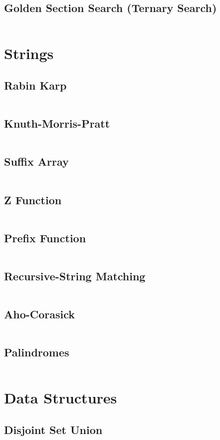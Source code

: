 \documentclass[a4paper, 10pt, twocolumn, landscape]{article}
\begin{document}
  \subsection{Golden Section Search (Ternary Search)}
  \inputminted{cpp}{math/gss.cpp}

  \section{Strings}
  \subsection{Rabin Karp}
  \inputminted{cpp}{strings/rabin-karp.cpp}
  \subsection{Knuth-Morris-Pratt}
  \inputminted{cpp}{strings/kmp.cpp}
  \subsection{Suffix Array}
  \inputminted{cpp}{strings/suffix-array.cpp}
  \subsection{Z Function}
  \inputminted{cpp}{strings/z.cpp}
  \subsection{Prefix Function}
  \inputminted{cpp}{strings/prefix.cpp}
  \subsection{Recursive-String Matching}
  \inputminted{cpp}{strings/recursive-string-matching.cpp}
  \subsection{Aho-Corasick}
  \inputminted{cpp}{strings/aho.cpp}
  \subsection{Palindromes}
  \inputminted{cpp}{strings/manacher.cpp}

  \section{Data Structures}
  \subsection{Disjoint Set Union}
  \inputminted{cpp}{data-structures/dsu.cpp}
\end{document}
